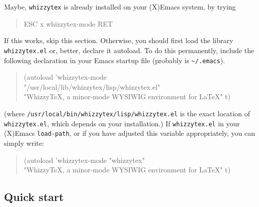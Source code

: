 \documentclass[12pt]{article}
\let \lst \verb
\begin{document}
Maybe, {\tt whizzytex} is already installed on your (X)Emacs system, by trying
\begin{quote}
\begin{tt}
ESC x whizzytex-mode RET
\end{tt}
\end{quote}
If this works, skip this section.
Otherwise, you should first load the library \lst"whizzytex.el" or, better,
declare it autoload. To do this permanently, include the following
declaration in your Emacs startup file (probably is \lst"~/.emacs").
\begin{quote}\small
\begin{tt}
(autoload 'whizzytex-mode \\ \indent\obeyspaces
    "/usr/local/lib/whizzytex/lisp/whizzytex.el" \\ \indent\obeyspaces
    "WhizzyTeX, a minor-mode WYSIWIG environment for LaTeX" t)
\end{tt}
\end{quote}
(where  \lst"/usr/local/bin/whizzytex/lisp/whizzytex.el" is the 
exact location of \lst"whizzytex.el", which depends on your installation.)
If  \lst"whizzytex.el" in your (X)Emacs {\tt load-path}, or if you have 
adjusted this variable appropriately, you can simply write:
\begin{quote}\small
\begin{tt}
(autoload 'whizzytex-mode "whizzytex" \\ \indent \obeyspaces
    "WhizzyTeX, a minor-mode WYSIWIG environment for LaTeX" t)
\end{tt}
\end{quote}

\subsection {Quick start} 
\end{document}
